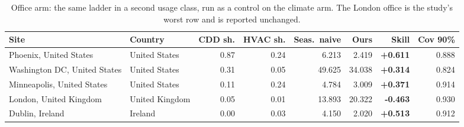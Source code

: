\begin{table}[t]
\centering
\scriptsize
\setlength{\tabcolsep}{3pt}
\begin{tabular}{llrrrrrr}
\toprule
Site & Country & CDD sh. & HVAC sh. & Seas.\ naive & Ours & Skill & Cov 90\% \\
\midrule
Phoenix, United States & United States & 0.87 & 0.24 & 6.213 & 2.419 & \textbf{+0.611} & 0.888 \\
Washington DC, United States & United States & 0.31 & 0.05 & 49.625 & 34.038 & \textbf{+0.314} & 0.824 \\
Minneapolis, United States & United States & 0.11 & 0.24 & 4.784 & 3.009 & \textbf{+0.371} & 0.914 \\
London, United Kingdom & United Kingdom & 0.05 & 0.01 & 13.893 & 20.322 & \textbf{-0.463} & 0.930 \\
Dublin, Ireland & Ireland & 0.00 & 0.03 & 4.150 & 2.020 & \textbf{+0.513} & 0.912 \\
\bottomrule
\end{tabular}
\caption{Office arm: the same ladder in a second usage class, run as a control on the climate arm. The London office is the study's worst row and is reported unchanged.}
\label{tab:office}
\end{table}
